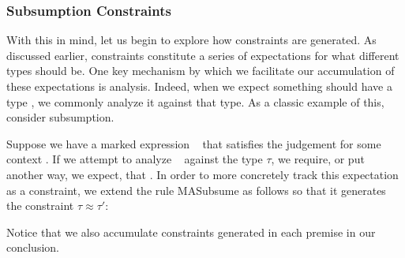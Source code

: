 

\subsubsection{Subsumption Constraints}
With this in mind, let us begin to explore how constraints are generated. As discussed earlier, constraints constitute a series of expectations for what different types should be. One key mechanism by which we facilitate our accumulation of these expectations is analysis. Indeed, when we expect something should have a type \TMV, we commonly analyze it against that type. As a classic example of this, consider subsumption. 

Suppose we have a marked expression \ECMV~ that satisfies the judgement  for some context \ctx. If we attempt to analyze \ECMV~ against the type $\tau$, we require, or put another way, we expect, that . In order to more concretely track this expectation as a constraint, we extend the rule MASubsume as follows so that it generates the constraint $\tau \approx \tau'$:
\begin{mathpar}
\end{mathpar}
Notice that we also accumulate constraints generated in each premise in our conclusion.

